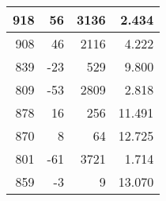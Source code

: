 \begin{longtable}{|r|r|r|r|}
	918                                                                                             & 56                                                & 3136                                                 & 2.434                                                                                          \\ \hline
	908                                                                                             & 46                                                & 2116                                                 & 4.222                                                                                          \\ \hline
	839                                                                                             & -23                                               & 529                                                  & 9.800                                                                                          \\ \hline
	809                                                                                             & -53                                               & 2809                                                 & 2.818                                                                                          \\ \hline
	878                                                                                             & 16                                                & 256                                                  & 11.491                                                                                         \\ \hline
	870                                                                                             & 8                                                 & 64                                                   & 12.725                                                                                         \\ \hline
	801                                                                                             & -61                                               & 3721                                                 & 1.714                                                                                          \\ \hline
	859                                                                                             & -3                                                & 9                                                    & 13.070                                                                                         \\ \hline

\end{longtable}
